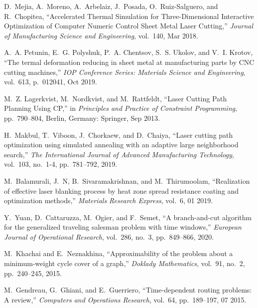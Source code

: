   \item
  D.~Mejia, A.~Moreno, A.~Arbelaiz, J.~Posada, O.~Ruiz-Salguero, and R.~Chopitea,
    ``{Accelerated Thermal Simulation for Three-Dimensional Interactive
    Optimization of Computer Numeric Control Sheet Metal Laser Cutting},'' {\em
    Journal of Manufacturing Science and Engineering}, vol.~140, Mar 2018.

  \item
  A.~A. Petunin, E.~G. Polyshuk, P.~A. Chentsov, S.~S. Ukolov, and V.~I. Krotov,
    ``{The termal deformation reducing in sheet metal at manufacturing parts by
    {CNC} cutting machines},'' {\em IOP Conference Series: Materials Science and
    Engineering}, vol.~613, p.~012041, Oct 2019.

  \item
  M.~Z. Lagerkvist, M.~Nordkvist, and M.~Rattfeldt, ``{Laser Cutting Path
    Planning Using CP},'' in {\em {Principles and Practice of Constraint
    Programming}}, pp.~790--804, Berlin, Germany: Springer, Sep 2013.

  \item
  H.~Makbul, T.~Viboon, J.~Chorkaew, and D.~Chaiya, ``Laser cutting path
    optimization using simulated annealing with an adaptive large neighborhood
    search,'' {\em The International Journal of Advanced Manufacturing
    Technology}, vol.~103, no.~1-4, pp.~781--792, 2019.

  \item
  M.~Balamurali, J.~N, B.~Sivaramakrishnan, and M.~Thirumoolam, ``Realization of
    effective laser blanking process by heat zone spread resistance coating and
    optimization methods,'' {\em Materials Research Express}, vol.~6, 01 2019.

  \item
  Y.~Yuan, D.~Cattaruzza, M.~Ogier, and F.~Semet, ``A branch-and-cut algorithm
    for the generalized traveling salesman problem with time windows,'' {\em
    European Journal of Operational Research}, vol.~286, no.~3, pp.~849--866,
    2020.

  \item
  M.~Khachai and E.~Neznakhina, ``Approximability of the problem about a
    minimum-weight cycle cover of a graph,'' {\em Doklady Mathematics}, vol.~91,
    no.~2, pp.~240--245, 2015.

  \item
  M.~Gendreau, G.~Ghiani, and E.~Guerriero, ``Time-dependent routing problems: A
    review,'' {\em Computers and Operations Research}, vol.~64, pp.~189--197, 07
    2015.

